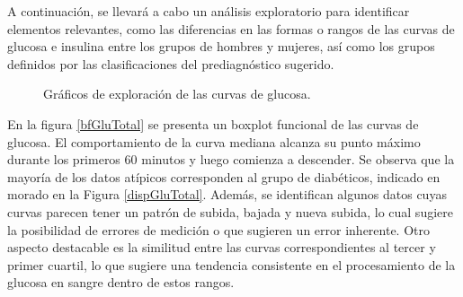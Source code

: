 A continuación, se llevará a cabo un análisis exploratorio para identificar elementos relevantes, como las diferencias en las formas o rangos de las curvas de glucosa e insulina entre los grupos de hombres y mujeres, así como los grupos definidos por las clasificaciones del prediagnóstico sugerido.



\begin{figure}[H]
 \centering
    \caption{Gráficos de exploración de las curvas de glucosa.}
    \label{fig:glucosa}
\end{figure}


En la figura \ref{bfGluTotal} se presenta un boxplot funcional de las curvas de glucosa. El comportamiento de la curva mediana alcanza su punto máximo durante los primeros $60$ minutos y luego comienza a descender. Se observa que la mayoría de los datos atípicos corresponden al grupo de diabéticos, indicado en morado en la Figura \ref{dispGluTotal}. Además, se identifican algunos datos cuyas curvas parecen tener un patrón de subida, bajada y nueva subida, lo cual sugiere la posibilidad de errores de medición o que sugieren un error inherente. Otro aspecto destacable es la similitud entre las curvas correspondientes al tercer y primer cuartil, lo que sugiere una tendencia consistente en el procesamiento de la glucosa en sangre dentro de estos rangos.


